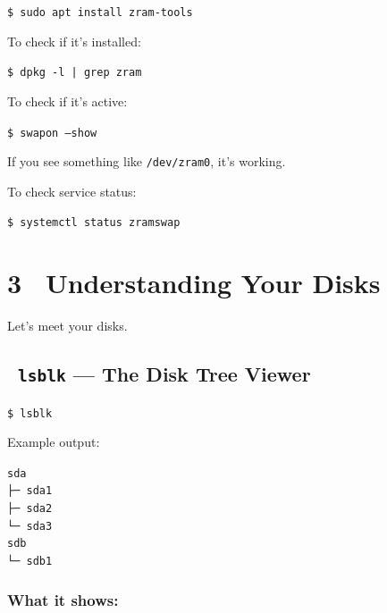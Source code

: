 \documentclass[12pt]{article}
\newcommand{\diskon}{\faHdd}              %
\begin{document}
\begin{highlightbox}
\texttt{\$ sudo apt install zram-tools}
\end{highlightbox}

To check if it's installed:

\begin{highlightbox}
\texttt{\$ dpkg -l | grep zram}
\end{highlightbox}

To check if it's active:

\begin{highlightbox}
\texttt{\$ swapon --show}
\end{highlightbox}

\begin{infobox}
If you see something like \texttt{/dev/zram0}, it's working.
\end{infobox}

To check service status:

\begin{highlightbox}
\texttt{\$ systemctl status zramswap}
\end{highlightbox}

\section*{3 \diskon\ Understanding Your Disks}

Let's meet your disks.

\subsection*{\faTree\ \texttt{lsblk} — The Disk Tree Viewer}

\begin{highlightbox}
\texttt{\$ lsblk}
\end{highlightbox}

Example output:

\begin{highlightbox}
\texttt{sda}\\
\texttt{├─ sda1}\\
\texttt{├─ sda2}\\
\texttt{└─ sda3}\\
\texttt{sdb}\\
\texttt{└─ sdb1}
\end{highlightbox}

\subsubsection*{What it shows:}
\end{document}
